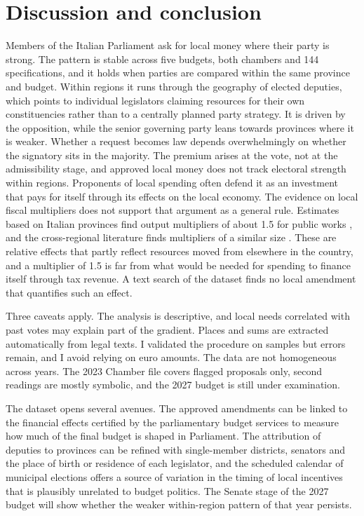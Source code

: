 \documentclass[12pt]{article}
\begin{document}
\section{Discussion and conclusion}\label{sec:concl}

Members of the Italian Parliament ask for local money where their party is strong. The pattern is stable across five budgets, both chambers and 144 specifications, and it holds when parties are compared within the same province and budget. Within regions it runs through the geography of elected deputies, which points to individual legislators claiming resources for their own constituencies rather than to a centrally planned party strategy. It is driven by the opposition, while the senior governing party leans towards provinces where it is weaker. Whether a request becomes law depends overwhelmingly on whether the signatory sits in the majority. The premium arises at the vote, not at the admissibility stage, and approved local money does not track electoral strength within regions.
Proponents of local spending often defend it as an investment that pays for itself through its effects on the local economy. The evidence on local fiscal multipliers does not support that argument as a general rule. Estimates based on Italian provinces find output multipliers of about 1.5 for public works \citep{acconcia2014}, and the cross-regional literature finds multipliers of a similar size \citep{chodorowreich2019}. These are relative effects that partly reflect resources moved from elsewhere in the country, and a multiplier of 1.5 is far from what would be needed for spending to finance itself through tax revenue. A text search of the dataset finds no local amendment that quantifies such an effect.


Three caveats apply. The analysis is descriptive, and local needs correlated with past votes may explain part of the gradient. Places and sums are extracted automatically from legal texts. I validated the procedure on samples but errors remain, and I avoid relying on euro amounts. The data are not homogeneous across years. The 2023 Chamber file covers flagged proposals only, second readings are mostly symbolic, and the 2027 budget is still under examination.

The dataset opens several avenues. The approved amendments can be linked to the financial effects certified by the parliamentary budget services to measure how much of the final budget is shaped in Parliament. The attribution of deputies to provinces can be refined with single-member districts, senators and the place of birth or residence of each legislator, and the scheduled calendar of municipal elections offers a source of variation in the timing of local incentives that is plausibly unrelated to budget politics. The Senate stage of the 2027 budget will show whether the weaker within-region pattern of that year persists.
\end{document}
